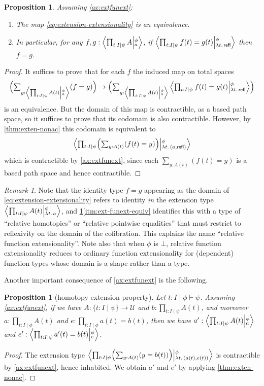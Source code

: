 \documentclass[12pt]{amsart}
\theoremstyle{plain}
\newtheorem{prop}[thm]{Proposition}
\theoremstyle{definition}
\theoremstyle{remark}
\newtheorem{rmk}[thm]{Remark}
\numberwithin{equation}{section}
\newcommand{\tprod}{\textstyle\prod}
\newcommand{\tsum}{\textstyle\sum}
\newcommand{\exten}[4]{\left\langle\mathchoice{\textstyle\prod_{#1}}{\textstyle\prod_{#1}}{\scriptstyle\prod_{#1}}{\scriptscriptstyle\prod_{#1}} #2 \middle|^{#3}_{#4}\right\rangle}
\newcommand{\types}{\vdash}
\newcommand{\univtype}{\mathcal{U}}
\newcommand{\sh}[2]{\{#1\mid #2\}}
\newcommand{\refl}{\mathsf{refl}}
\newcommand{\lam}[1]{\lambda #1.\,}
\newcommand{\Parens}[1]{\Bigl(#1\Bigr)}
\begin{document}
\begin{prop}\label{thm:ext-funext}
  Assuming \cref{ax:extfunext}:
  \begin{enumerate}[label=(\roman*)]
  \item\label{itm:ext-funext-equiv} The map \eqref{eq:extension-extensionality} is an equivalence.
  \item\label{itm:ext-funext-naive}  In particular, for any $f,g:\exten{t:I \mid \psi}{A}{\phi}{a}$, if $\exten{t:I \mid \psi}{f(t)=g(t)}{\phi}{\lam{t}\refl}$ then $f=g$.
  \end{enumerate}
\end{prop}
\begin{proof}
  It suffices to prove that for each $f$ the induced map on total spaces
  \[ \Parens{\tsum_{g:\exten{t:I \mid \psi}{A(t)}{\phi}{a}} (f=g)} \to \Parens{\tsum_{g:\exten{t:I \mid \psi}{A(t)}{\phi}{a}} \exten{t:I \mid \psi}{f(t)=g(t)}{\phi}{\lam{t}\refl}}\]
  is an equivalence.
  But the domain of this map is contractible, as a based path space, so it suffices to prove that its codomain is also contractible.
  However, by \cref{thm:exten-nonac} this codomain is equivalent to
  \[ \exten{t:I\mid\psi}{\Parens{\tsum_{y:A(t)} (f(t) = y)}}{\phi}{\lam{t}(a,\refl)} \]
  which is contractible by \cref{ax:extfunext}, since each $\tsum_{y:A(t)} (f(t) = y)$ is a based path space and hence contractible.
\end{proof}

\begin{rmk}
Note that the identity type $f=g$ appearing as the domain of \eqref{eq:extension-extensionality} refers to identity \emph{in} the extension type $\exten{t:I \mid \psi}{A(t)}{\phi}{\lam{t}a}$, and \cref{thm:ext-funext}\ref{itm:ext-funext-equiv} identifies this with a type of ``relative homotopies'' or ``relative pointwise equalities'' that must restrict to reflexivity on the domain of the cofibration.
This explains the name ``relative function extensionality''.
Note also that when $\phi$ is $\bot$, relative function extensionality reduces to ordinary function extensionality for (dependent) function types whose domain is a shape rather than a type.
\end{rmk}

Another important consequence of \cref{ax:extfunext} is the following.

\begin{prop}[homotopy extension property]\label{thm:hep} Let $t:I \mid \phi\types\psi$.
  Assuming \cref{ax:extfunext},
  if we have $A:\sh{t:I}{\psi}\to\univtype$ and $b:\tprod_{t:I\mid\psi} A(t)$, and moreover $a:\tprod_{t:I\mid\phi} A(t)$ and $e:\tprod_{t:I\mid\phi} a(t) = b(t)$, then we have $a':\exten{t:I\mid\psi}{A(t)}{\phi}{a}$ and $e':\exten{t:I\mid\psi}{a'(t)=b(t)}{\phi}{e}$.
\end{prop}
\begin{proof}
  The extension type $\exten{t:I\mid\psi}{\Parens{\tsum_{y:A(t)} (y=b(t))}}{\phi}{\lam{t}(a(t),e(t))}$ is contractible by \cref{ax:extfunext}, hence inhabited.
  We obtain $a'$ and $e'$ by applying \cref{thm:exten-nonac}.
\end{proof}
\end{document}
